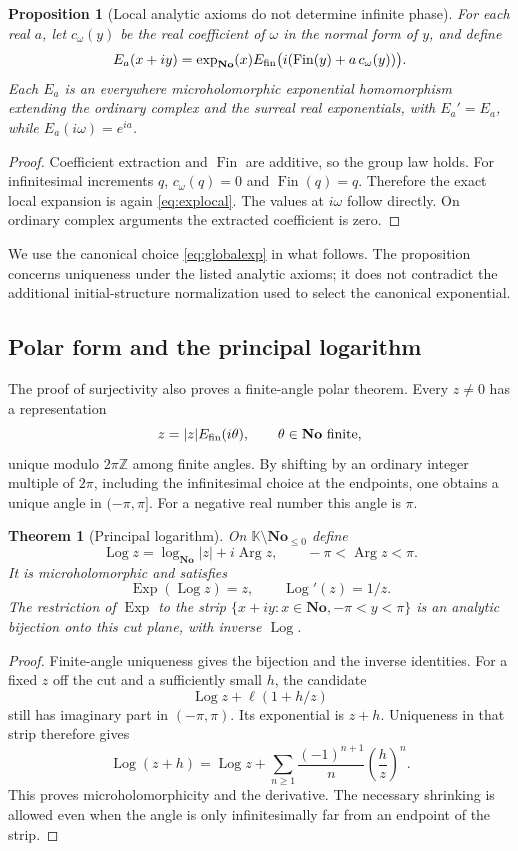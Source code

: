 \documentclass[11pt,letterpaper]{article}
\numberwithin{equation}{section}
\newtheorem{theorem}{Theorem}[section]
\newtheorem{proposition}[proposition]{Proposition}
\theoremstyle{definition}
\theoremstyle{remark}
\newcommand{\No}{\mathbf{No}}
\newcommand{\K}{\mathbb K}
\newcommand{\Z}{\mathbb Z}
\DeclareMathOperator{\Exp}{Exp}
\DeclareMathOperator{\Log}{Log}
\DeclareMathOperator{\Arg}{Arg}
\DeclareMathOperator{\Fin}{Fin}
\begin{document}
\begin{proposition}[Local analytic axioms do not determine infinite phase]
For each real $a$, let $c_\omega(y)$ be the real coefficient of $\omega$
in the normal form of $y$, and define
\[
 E_a(x+iy)=\exp_{\No}(x)
 E_{\rm fin}\bigl(i(\Fin(y)+a\,c_\omega(y))\bigr).
\]
Each $E_a$ is an everywhere microholomorphic exponential homomorphism
extending the ordinary complex and the surreal real exponentials, with
$E_a'=E_a$, while $E_a(i\omega)=e^{ia}$.
\end{proposition}
\begin{proof}
Coefficient extraction and $\Fin$ are additive, so the group law holds.
For infinitesimal increments $q$, $c_\omega(q)=0$ and $\Fin(q)=q$.
Therefore the exact local expansion is again \eqref{eq:explocal}.
The values at $i\omega$ follow directly. On ordinary complex arguments
the extracted coefficient is zero.
\end{proof}

We use the canonical choice \eqref{eq:globalexp} in what follows.
The proposition concerns uniqueness under the listed analytic axioms;
it does not contradict the additional initial-structure normalization
used to select the canonical exponential.

\subsection{Polar form and the principal logarithm}

The proof of surjectivity also proves a finite-angle polar theorem.
Every $z\ne0$ has a representation
\[
 z=|z|E_{\rm fin}(i\theta),\qquad\theta\in\No\text{ finite},
\]
unique modulo $2\pi\Z$ among finite angles. By shifting by an ordinary
integer multiple of $2\pi$, including the infinitesimal choice at the
endpoints, one obtains a unique angle in $(-\pi,\pi]$.
For a negative real number this angle is $\pi$.

\begin{theorem}[Principal logarithm]\label{thm:log}
On $\K\setminus\No_{\le0}$ define
\[
 \Log z=\log_{\No}|z|+i\Arg z,\qquad -\pi<\Arg z<\pi.
\]
It is microholomorphic and satisfies
\[
 \Exp(\Log z)=z,\qquad \Log'(z)=1/z.
\]
The restriction of $\Exp$ to the strip
$\{x+iy:x\in\No,-\pi<y<\pi\}$ is an analytic bijection onto this
cut plane, with inverse $\Log$.
\end{theorem}
\begin{proof}
Finite-angle uniqueness gives the bijection and the inverse identities.
For a fixed $z$ off the cut and a sufficiently small $h$, the candidate
\[
 \Log z+\ell(1+h/z)
\]
still has imaginary part in $(-\pi,\pi)$. Its exponential is $z+h$.
Uniqueness in that strip therefore gives
\[
 \Log(z+h)=\Log z+
 \sum_{n\ge1}\frac{(-1)^{n+1}}{n}\left(\frac hz\right)^n.
\]
This proves microholomorphicity and the derivative. The necessary
shrinking is allowed even when the angle is only infinitesimally far
from an endpoint of the strip.
\end{proof}
\end{document}
